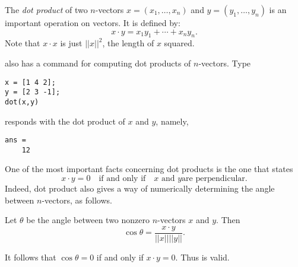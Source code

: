 \documentclass{ximera}
\begin{document}
The {\em dot product\/} of two $n$-vectors
$x=(x_1,\ldots,x_n)$ and $y=(y_1,\ldots,y_n)$ is an important
operation on vectors.  It is defined by:
\begin{equation}  \label{e:dotproduct}
x\cdot y = x_1y_1 + \cdots + x_ny_n.
\end{equation}
Note that $x\cdot x$ is just $||x||^2$, the length of $x$
squared.

\Matlab also has a command for computing dot products of
$n$-vectors.  Type
\begin{verbatim}
x = [1 4 2];
y = [2 3 -1];
dot(x,y)
\end{verbatim}
\Matlab responds with the dot product of $x$ and $y$, namely,
\begin{verbatim}
ans =
    12
\end{verbatim}

One of the most important facts concerning dot products is the
one that states
\begin{equation} \label{dotprod=0}
x\cdot y = 0 \quad \mbox{if and only if} \quad \mbox{$x$ and $y$
are perpendicular}.
\end{equation}  
Indeed, dot product also gives a way of numerically determining
the angle between $n$-vectors, as follows.
\begin{theorem} \label{T:dotangle}
Let $\theta$ be the angle between two nonzero $n$-vectors $x$
and $y$.  Then
\begin{equation}  \label{e:dotproductang}
\cos \theta = \frac{x\cdot y}{||x|| ||y||}.
\end{equation}
\end{theorem}
It follows that $\cos \theta=0$
if and only if $x\cdot y = 0$.  Thus  is valid.
\end{document}
